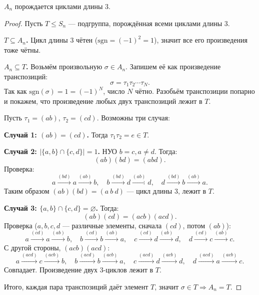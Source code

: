 \begin{lemma}
    $A_n$ порождается циклами длины $3$.
    \begin{proof}
        Пусть $T \leq S_n$ --- подгруппа, порождённая всеми циклами длины $3$.
 
        \textbf{$T \subseteq A_n$.} Цикл длины $3$ чётен ($\mathrm{sgn} = (-1)^2 = 1$), значит все его произведения тоже чётны.
 
        \textbf{$A_n \subseteq T$.} Возьмём произвольную $\sigma \in A_n$. Запишем её как произведение транспозиций:
        \[
            \sigma = \tau_1 \tau_2 \cdots \tau_N.
        \]
        Так как $\mathrm{sgn}(\sigma) = 1 = (-1)^N$, число $N$ чётно. Разобьём транспозиции попарно и покажем, что произведение любых двух транспозиций лежит в $T$.
 
        Пусть $\tau_1 = (ab)$, $\tau_2 = (cd)$. Возможны три случая:
 
        \textbf{Случай 1: $(ab) = (cd)$.} Тогда $\tau_1\tau_2 = e \in T$.
 
        \textbf{Случай 2: $|\{a,b\}\cap\{c,d\}|=1$.} НУО $b = c, a \ne d$. Тогда:
        \[
            (ab)(bd) = (abd).
        \]
        Проверка:
        \[
            a \xrightarrow{(bd)} a \xrightarrow{(ab)} b, \quad
            b \xrightarrow{(bd)} d \xrightarrow{(ab)} d, \quad
            d \xrightarrow{(bd)} b \xrightarrow{(ab)} a.
        \]
        Таким образом $(ab)(bd) = (a\ b\ d)$ --- цикл длины $3$, лежит в $T$.
 
        \textbf{Случай 3: $\{a,b\}\cap\{c,d\}=\varnothing$.} Тогда:
        \[
            (ab)(cd) = (acb)(acd).
        \]
        Проверка ($a,b,c,d$ --- различные элементы, сначала $(cd)$, потом $(ab)$):
        \[
            a \xrightarrow{(cd)} a \xrightarrow{(ab)} b, \quad
            b \xrightarrow{(cd)} b \xrightarrow{(ab)} a, \quad
            c \xrightarrow{(cd)} d \xrightarrow{(ab)} d, \quad
            d \xrightarrow{(cd)} c \xrightarrow{(ab)} c.
        \]
        С другой стороны, $(acb)(acd)$:
        \[
            a \xrightarrow{(acd)} c \xrightarrow{(acb)} b, \quad
            b \xrightarrow{(acd)} b \xrightarrow{(acb)} a, \quad
            c \xrightarrow{(acd)} d \xrightarrow{(acb)} d, \quad
            d \xrightarrow{(acd)} a \xrightarrow{(acb)} c.
        \]
        Совпадает.  Произведение двух 3-циклов лежит в $T$.
 
        Итого, каждая пара транспозиций даёт элемент $T$, значит $\sigma \in T \Rightarrow A_n = T$.
    \end{proof}
\end{lemma}
 
